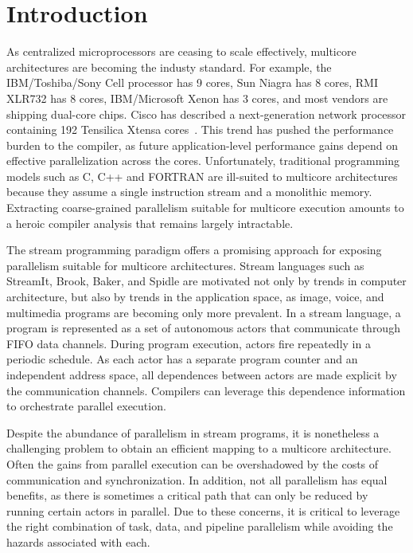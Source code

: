 \section{Introduction}


As centralized microprocessors are ceasing to scale effectively,
multicore architectures are becoming the industy standard.  For
example, the IBM/Toshiba/Sony Cell processor has 9 cores\cite{}, Sun
Niagra has 8 cores\cite{}, RMI XLR732 has 8 cores\cite{},
IBM/Microsoft Xenon has 3 cores\cite{}, and most vendors are shipping
dual-core chips.  Cisco has described a next-generation network
processor containing 192 Tensilica Xtensa cores~\cite{etherton05ancs}.
This trend has pushed the performance burden to the compiler, as
future application-level performance gains depend on effective
parallelization across the cores.  Unfortunately, traditional
programming models such as C, C++ and FORTRAN are ill-suited to
multicore architectures because they assume a single instruction
stream and a monolithic memory.  Extracting coarse-grained parallelism
suitable for multicore execution amounts to a heroic compiler analysis
that remains largely intractable.

The stream programming paradigm offers a promising approach for
exposing parallelism suitable for multicore architectures.  Stream
languages such as StreamIt\cite{}, Brook\cite{}, Baker\cite{}, and
Spidle\cite{} are motivated not only by trends in computer
architecture, but also by trends in the application space, as image,
voice, and multimedia programs are becoming only more prevalent.  In a
stream language, a program is represented as a set of autonomous
actors that communicate through FIFO data channels.  During program
execution, actors fire repeatedly in a periodic schedule.  As each
actor has a separate program counter and an independent address space,
all dependences between actors are made explicit by the communication
channels.  Compilers can leverage this dependence information to
orchestrate parallel execution.

Despite the abundance of parallelism in stream programs, it is
nonetheless a challenging problem to obtain an efficient mapping to a
multicore architecture.  Often the gains from parallel execution can
be overshadowed by the costs of communication and synchronization.  In
addition, not all parallelism has equal benefits, as there is
sometimes a critical path that can only be reduced by running certain
actors in parallel.  Due to these concerns, it is critical to leverage
the right combination of task, data, and pipeline parallelism while
avoiding the hazards associated with each.

